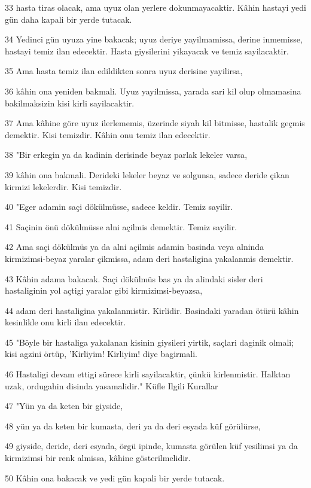 \par 33 hasta tiras olacak, ama uyuz olan yerlere dokunmayacaktir. Kâhin hastayi yedi gün daha kapali bir yerde tutacak.
\par 34 Yedinci gün uyuza yine bakacak; uyuz deriye yayilmamissa, derine inmemisse, hastayi temiz ilan edecektir. Hasta giysilerini yikayacak ve temiz sayilacaktir.
\par 35 Ama hasta temiz ilan edildikten sonra uyuz derisine yayilirsa,
\par 36 kâhin ona yeniden bakmali. Uyuz yayilmissa, yarada sari kil olup olmamasina bakilmaksizin kisi kirli sayilacaktir.
\par 37 Ama kâhine göre uyuz ilerlememis, üzerinde siyah kil bitmisse, hastalik geçmis demektir. Kisi temizdir. Kâhin onu temiz ilan edecektir.
\par 38 "Bir erkegin ya da kadinin derisinde beyaz parlak lekeler varsa,
\par 39 kâhin ona bakmali. Derideki lekeler beyaz ve solgunsa, sadece deride çikan kirmizi lekelerdir. Kisi temizdir.
\par 40 "Eger adamin saçi dökülmüsse, sadece keldir. Temiz sayilir.
\par 41 Saçinin önü dökülmüsse alni açilmis demektir. Temiz sayilir.
\par 42 Ama saçi dökülmüs ya da alni açilmis adamin basinda veya alninda kirmizimsi-beyaz yaralar çikmissa, adam deri hastaligina yakalanmis demektir.
\par 43 Kâhin adama bakacak. Saçi dökülmüs bas ya da alindaki sisler deri hastaliginin yol açtigi yaralar gibi kirmizimsi-beyazsa,
\par 44 adam deri hastaligina yakalanmistir. Kirlidir. Basindaki yaradan ötürü kâhin kesinlikle onu kirli ilan edecektir.
\par 45 "Böyle bir hastaliga yakalanan kisinin giysileri yirtik, saçlari daginik olmali; kisi agzini örtüp, 'Kirliyim! Kirliyim! diye bagirmali.
\par 46 Hastaligi devam ettigi sürece kirli sayilacaktir, çünkü kirlenmistir. Halktan uzak, ordugahin disinda yasamalidir." Küfle Ilgili Kurallar
\par 47 "Yün ya da keten bir giyside,
\par 48 yün ya da keten bir kumasta, deri ya da deri esyada küf görülürse,
\par 49 giyside, deride, deri esyada, örgü ipinde, kumasta görülen küf yesilimsi ya da kirmizimsi bir renk almissa, kâhine gösterilmelidir.
\par 50 Kâhin ona bakacak ve yedi gün kapali bir yerde tutacak.
